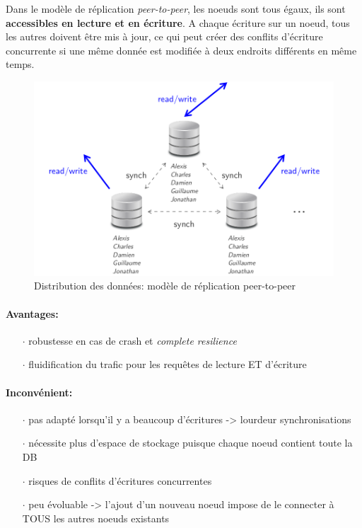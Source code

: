 \item{}
{\vrai}
{Dans le modèle de réplication \textit{peer-to-peer}, les noeuds sont tous égaux, ils sont \textbf{accessibles en lecture et en écriture}. A chaque écriture sur un noeud, tous les autres doivent être mis à jour, ce qui peut créer des conflits d'écriture concurrente si une même donnée est modifiée à deux endroits différents en même temps.
\begin{figure}[!h]
\center\includegraphics[scale=.3]{images/replication-peertopeer}
\caption{Distribution des données: modèle de réplication peer-to-peer \cite{ref1}}
\end{figure}

\paragraph{Avantages:}
\begin{itemize}
\item[$\cdot$]robustesse en cas de crash et \textit{complete resilience}
\item[$\cdot$]fluidification du trafic pour les requêtes de lecture ET d'écriture
\end{itemize}

\paragraph{Inconvénient:}
\begin{itemize}
\item[$\cdot$]pas adapté lorsqu'il y a beaucoup d'écritures -> lourdeur synchronisations
\item[$\cdot$]nécessite plus d'espace de stockage puisque chaque noeud contient toute la DB
\item[$\cdot$]risques de conflits d'écritures concurrentes
\item[$\cdot$]peu évoluable -> l'ajout d'un nouveau noeud impose de le connecter à TOUS les autres noeuds existants
\end{itemize}
}


